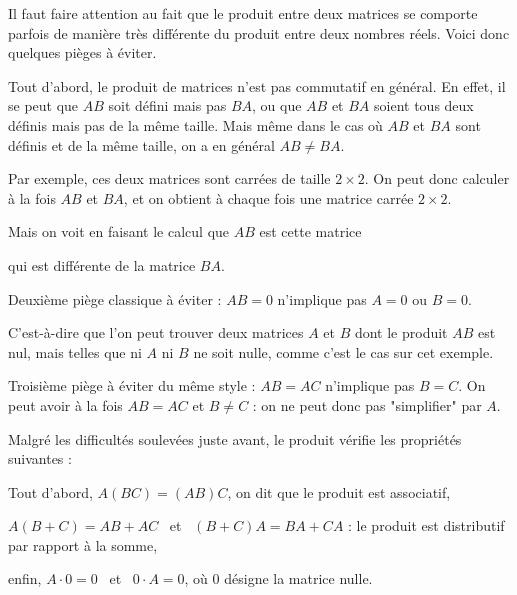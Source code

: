 \diapo

Il faut faire attention au fait que le produit entre deux matrices 
se comporte parfois de manière très différente du produit entre deux nombres réels. Voici donc quelques pièges à éviter.

Tout d'abord, le produit de matrices n'est pas commutatif en général. En effet, il se peut que $AB$ soit défini mais pas $BA$, ou que $AB$ et $BA$ 
soient tous deux définis mais pas de la même taille. 
Mais même dans le cas où $AB$ et $BA$ sont définis et de la même taille, on a en général $AB\neq BA$. 

\change
Par exemple, ces deux matrices sont carrées de taille $2\times2$. On peut donc calculer à la fois $AB$ et $BA$, 
et on obtient à chaque fois une matrice carrée  $2\times2$. 


\change
Mais on voit en faisant le calcul que $AB$ est cette matrice

\change
qui est différente de la matrice $BA$.

\change
Deuxième piège classique à éviter : $AB=0$ n'implique pas $A=0$ ou $B=0$.

\change
C'est-à-dire que l'on peut trouver deux matrices $A$ et $B$ dont le produit $AB$ est nul, 
mais telles que ni $A$ ni $B$ ne soit nulle, comme c'est le cas sur cet exemple.

\change

Troisième piège à éviter du même style : $AB=AC$ n'implique pas $B=C$.
On peut avoir à la fois $AB  = AC$ et $B \neq C$ : on ne peut donc pas "simplifier" par $A$.

% 
% 
% 


\diapo
Malgré les difficultés soulevées juste avant, le produit vérifie les propriétés suivantes :

Tout d'abord,  $A (BC) = (AB) C$, on dit que le produit est associatif, 
 
\change
 $A(B+C) = AB + AC$ \ et \ $(B+C) A = BA + CA$ : le produit est distributif par rapport à la somme,

\change
enfin, $A\cdot 0 = 0$ \ et \ $0\cdot A= 0$, où $0$ désigne la matrice nulle.
 

